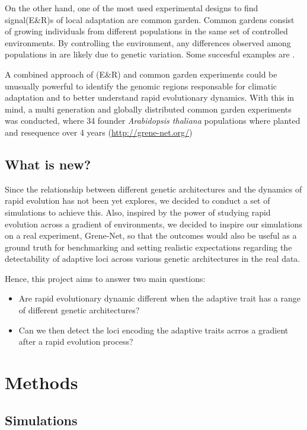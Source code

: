 \documentclass{article}
\begin{document}
On the other hand, one of the most used experimental designs to find signal(E\&R)s of local adaptation are common garden. Common gardens consist of growing individuals from different populations in the same set of controlled environments. By controlling the environment, any differences observed among populations in are likely due to genetic variation. Some succesful examples are \citep{Exposito-Alonso2019-hs, Lepais2014-za}.

A combined approach of (E\&R) and common garden experiments could be unusually powerful to identify the genomic regions responsable for climatic adaptation and to better understand rapid evolutionary dynamics. With this in mind, a multi generation and globally distributed common garden experiments was conducted, where 34 founder \textit{Arabidopsis thaliana} populations where planted and resequence over 4 years (\url{http://grene-net.org/})

\subsection{What is new?}
Since the relationship between different genetic architectures and the dynamics of rapid evolution has not been yet explores, we decided to conduct a set of simulations to achieve this. Also, inspired by the power of studying rapid evolution across a gradient of environments, we decided to inspire our simulations on a real experiment, Grene-Net, so that the outcomes would also be useful as a ground truth for benchmarking and setting realistic expectations regarding the detectability of adaptive loci across various genetic architectures in the real data. 

Hence, this project aims to answer two main questions: 
\begin{itemize}
    \item Are rapid evolutionary dynamic different when the adaptive trait has a range of different genetic architectures? 
    \item Can we then detect the loci encoding the adaptive traits acrros a gradient after a rapid evolution process?
\end{itemize}

\section{Methods}
\subsection{Simulations}
\end{document}
